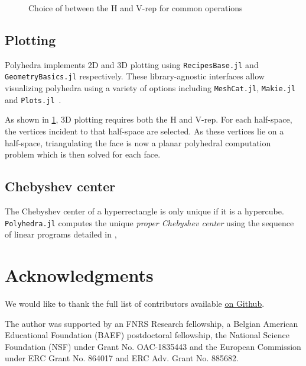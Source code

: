 \documentclass{juliacon}
\newcommand{\Vrep}{V-rep}
\newcommand{\jlpkg}[1]{\texttt{#1.jl}}
\begin{document}
\begin{figure}
  \caption{Choice of between the H and \Vrep{} for common operations}
  \label{op}
\end{figure}

\subsection{Plotting}

Polyhedra implements 2D and 3D plotting using \jlpkg{RecipesBase} and \jlpkg{GeometryBasics} respectively.
These library-agnostic interfaces allow
visualizing polyhedra using a variety of options including \jlpkg{MeshCat}, \jlpkg{Makie}~\cite{DanischKrumbiegel2021} and \jlpkg{Plots}~\cite{PlotsJL}.

As shown in \cref{op}, 3D plotting requires both the H and \Vrep{}.
For each half-space, the vertices incident to that half-space are selected.
As these vertices lie on a half-space, triangulating the face is now a planar polyhedral computation problem which is then solved for each face.

\subsection{Chebyshev center}

The Chebyshev center of a hyperrectangle is only unique
if it is a hypercube.
\jlpkg{Polyhedra} computes
the unique \emph{proper Chebyshev center} using
the sequence of linear programs
detailed in \cite[Section~4.5.1]{legat2020set},

\section*{Acknowledgments}

We would like to thank the full list of contributors available \href{https://github.com/JuliaPolyhedra/Polyhedra.jl/graphs/contributors}{on Github}.

The author was supported by
an FNRS Research fellowship,
a Belgian American Educational Foundation (BAEF) postdoctoral fellowship,
the National Science Foundation (NSF) under Grant No. OAC-1835443 and
the European Commission under ERC Grant No. 864017 and ERC Adv. Grant No. 885682.



\end{document}
